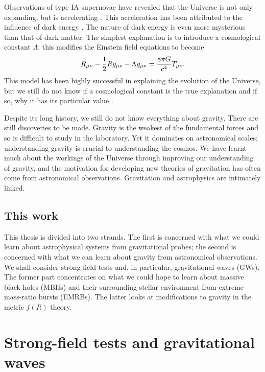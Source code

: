 Observations of type IA supernovae have revealed that the Universe is not only expanding, but is accelerating \citep{Riess1998,Perlmutter1999}. This acceleration has been attributed to the influence of dark energy \citep{Perlmutter1999a,Peebles2003}. The nature of dark energy is even more mysterious than that of dark matter. The simplest explanation is to introduce a cosmological constant $\Lambda$; this modifies the Einstein field equations to become \citep[document 43]{Einstein1997}
\begin{equation}
R_{\mu\nu} - \frac{1}{2}R g_{\mu\nu} - \Lambda g_{\mu\nu} = \frac{8\pi G}{c^4}T_{\mu\nu}.
\end{equation}
This model has been highly successful in explaining the evolution of the Universe, but we still do not know if a cosmological constant is the true explanation and if so, why it has its particular value \citep{Carroll2001}.

Despite its long history, we still do not know everything about gravity. There are still discoveries to be made. Gravity is the weakest of the fundamental forces and so is difficult to study in the laboratory. Yet it dominates on astronomical scales; understanding gravity is crucial to understanding the cosmos. We have learnt much about the workings of the Universe through improving our understanding of gravity, and the motivation for developing new theories of gravitation has often come from astronomical observations. Gravitation and astrophysics are intimately linked.

\subsection{This work}

This thesis is divided into two strands. The first is concerned with what we could learn about astrophysical systems from gravitational probes; the second is concerned with what we can learn about gravity from astronomical observations.  We shall consider strong-field tests and, in particular, gravitational waves (GWs). The former part concentrates on what we could hope to learn about massive black holes (MBHs) and their surrounding stellar environment from extreme-mass-ratio bursts (EMRBs). The latter looks at modifications to gravity in the metric $f(R)$ theory.

\section{Strong-field tests and gravitational waves}

